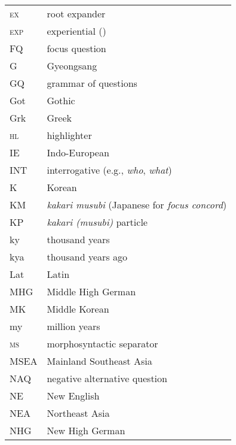 \begin{tabularx}{.45\textwidth}{lQ}  
\textsc{ex} & root expander \citep{Miyaoka2012}\\
\textsc{exp} & experiential (\citealt{SunChaofen2006})\\
FQ & {focus question}\\
G & Gyeongsang\\
GQ & grammar of {questions}\\
Got & {Gothic}\\
Grk & Greek\\
\textsc{hl} & highlighter \citep{Stern2005}\\
IE & Indo-European\\
INT & {interrogative} (e.g., \textit{who}, \textit{what})\\
K & {Korean}\\
KM & \textit{kakari musubi} ({Japanese} for \textit{{focus} concord}) \citep{Shinzato2015}\\
KP & \textit{kakari (musubi)} particle \citep{Shinzato2015}\\
ky & thousand years\\
kya & thousand years ago\\
Lat & {Latin}\\
MHG & {Middle High German}\\
MK & Middle {Korean}\\
my & million years\\
\textsc{ms} & morphosyntactic separator \citep{Vajda2004}\\
MSEA & {Mainland Southeast Asia}\\
NAQ & negative {alternative question}\\
NE & New {English}\\
NEA & {Northeast Asia}\\
NHG & New High {German}\\
\end{tabularx}

